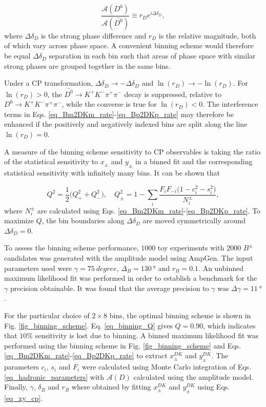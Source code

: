 \documentclass[12pt, a4paper, notitlepage, onecolumn]{article}
\numberwithin{equation}{section}
\begin{document}
\begin{equation}
  \frac{\mathcal{A}(D^0)}{\mathcal{A}(\bar{D^0})}\equiv r_De^{i\Delta\delta_D},
\end{equation}
where $\Delta\delta_D$ is the strong phase difference and $r_D$ is the relative magnitude, both of which vary across phase space. A convenient binning scheme would therefore be equal $\Delta\delta_D$ separation in each bin such that areas of phase space with similar strong phases are grouped together in the same bins.

Under a CP transformation, $\Delta\delta_D\to -\Delta\delta_D$ and $\ln(r_D)\to -\ln(r_D)$. For $\ln(r_D) > 0$, the $\bar{D^0}\to K^+K^-\pi^+\pi^-$ decay is suppressed, relative to $D^0\to K^+K^-\pi^+\pi^-$, while the converse is true for $\ln(r_D) < 0$. The interference terms in Eqs. \eqref{eq_Bm2DKm_rate}-\eqref{eq_Bp2DKp_rate} may therefore be enhanced if the positively and negatively indexed bins are split along the line $\ln(r_D) = 0$.

A measure of the binning scheme sensitivity to CP observables is taking the ratio of the statistical sensitivity to $x_\pm$ and $y_\pm$ in a binned fit and the corresponding statistical sensitivity with infinitely many bins. It can be shown that

\begin{equation}
  Q^2 = \frac{1}{2}\big(Q^2_+ + Q^2_-\big), \quad Q^2_\pm = 1 - \sum_i\frac{F_iF_{-i}\big(1 - c_i^2 - s_i^2\big)}{N_i^\pm},
  \label{eq_binning_Q}
\end{equation}
where $N_i^\pm$ are calculated using Eqs. \eqref{eq_Bm2DKm_rate}-\eqref{eq_Bp2DKp_rate}. To maximize $Q$, the bin boundaries along $\Delta\delta_D$ are moved symmetrically around $\Delta\delta_D = 0$.

To assess the binning scheme performance, $1000$ toy experiments with $2000$ $B^\pm$ candidates was generated with the amplitude model using AmpGen. The input parameters used were $\gamma = \SI{75}{degree}$, $\Delta_B = \SI{130}{\degree}$ and $r_B = 0.1$. An unbinned maximum likelihood fit was performed in order to establish a benchmark for the $\gamma$ precision obtainable. It was found that the average precision to $\gamma$ was $\Delta\gamma = \SI{11}{\degree}$.

For the particular choice of $2\times 8$ bins, the optimal binning scheme is shown in Fig. \ref{fig_binning_scheme}. Eq. \eqref{eq_binning_Q} gives $Q = 0.90$, which indicates that $10\%$ sensitivity is lost due to binning. A binned maximum likelihood fit was performed using the binning scheme in Fig. \ref{fig_binning_scheme} and Eqs. \eqref{eq_Bm2DKm_rate}-\eqref{eq_Bp2DKp_rate} to extract $x_\pm^{DK}$ and $y_\pm^{DK}$. The parameters $c_i$, $s_i$ and $F_i$ were calculated using Monte Carlo integration of Eqs. \eqref{eq_hadronic_parameters} with $\mathcal{A}(D)$ calculated using the amplitude model. Finally, $\gamma$, $\delta_B$ and $r_B$ where obtained by fitting $x_\pm^{DK}$ and $y_\pm^{DK}$ using Eqs. \eqref{eq_xy_cp}.
\end{document}
